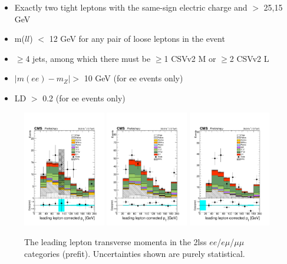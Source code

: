 \begin{itemize}
 \item Exactly two tight leptons with the same-sign electric charge and \pt $>$ 25,15 GeV
 \item m($ll$) $<$ 12 GeV for any pair of loose leptons in the event
 \item $\geq$4 jets, among which there must be $\geq$1 CSVv2 M or $\geq$2 CSVv2 L
 \item $|m(ee)-m_{Z}| >$ 10 GeV (for ee events only)
 \item \met LD $>$ 0.2 (for ee events only) 
\end{itemize}

\begin{figure}[htp]
\centering
\includegraphics[width=0.32\textwidth]{ch5_figs/l1_pt_ttH_ee_stackPlot_SR.pdf}
\includegraphics[width=0.32\textwidth]{ch5_figs/l1_pt_ttH_em_stackPlot_SR.pdf}
\includegraphics[width=0.32\textwidth]{ch5_figs/l1_pt_ttH_mm_stackPlot_SR.pdf} \\
\caption[Data/MC comparison of leading lepton \pt in the signal region]{The leading lepton transverse momenta in the 2lss $ee$/$e\mu$/$\mu\mu$ categories (prefit). Uncertainties shown are purely statistical.}
\label{fig:sr_l1pt}
\end{figure}

